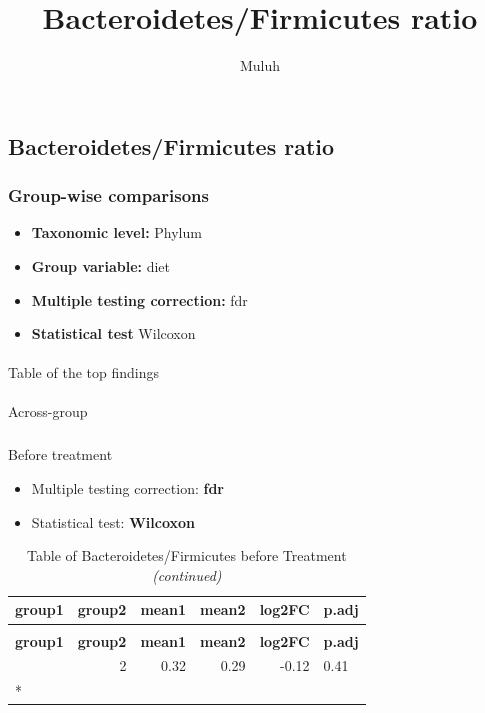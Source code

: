 \documentclass[
  letterpaper,
  DIV=11,
  numbers=noendperiod]{scrartcl}
\title{Bacteroidetes/Firmicutes ratio}
\author{Muluh}
\date{}
\makeatletter
\let\oldparagraph\paragraph
\renewcommand{\paragraph}{
    \@ifstar
      \xxxParagraphStar
      \xxxParagraphNoStar
  }
\newcommand{\xxxParagraphStar}[1]{\oldparagraph*{#1}\mbox{}}
\newcommand{\xxxParagraphNoStar}[1]{\oldparagraph{#1}\mbox{}}
\let\oldsubparagraph\subparagraph
\renewcommand{\subparagraph}{
    \@ifstar
      \xxxSubParagraphStar
      \xxxSubParagraphNoStar
  }
\newcommand{\xxxSubParagraphStar}[1]{\oldsubparagraph*{#1}\mbox{}}
\newcommand{\xxxSubParagraphNoStar}[1]{\oldsubparagraph{#1}\mbox{}}
\providecommand{\tightlist}{%
  \setlength{\itemsep}{0pt}\setlength{\parskip}{0pt}}\usepackage{longtable,booktabs,array}
\makeatother
\begin{document}
\maketitle


\subsection{Bacteroidetes/Firmicutes
ratio}\label{bacteroidetesfirmicutes-ratio}

\subsubsection{Group-wise comparisons}\label{group-wise-comparisons}

\begin{itemize}
\tightlist
\item
  \textbf{Taxonomic level:} Phylum
\item
  \textbf{Group variable:} diet
\item
  \textbf{Multiple testing correction:} fdr
\item
  \textbf{Statistical test} Wilcoxon
\end{itemize}

\paragraph{Table of the top findings}\label{table-of-the-top-findings}

\paragraph{Across-group}\label{across-group}

\subparagraph{Before treatment}\label{before-treatment}

\begin{itemize}
\tightlist
\item
  Multiple testing correction: \textbf{fdr}
\item
  Statistical test: \textbf{Wilcoxon}
\end{itemize}

\begin{longtable}[t]{lrrrrl}
\caption{Table of Bacteroidetes/Firmicutes before Treatment}\\
\toprule
\textbf{group1} & \textbf{group2} & \textbf{mean1} & \textbf{mean2} & \textbf{log2FC} & \textbf{p.adj}\\
\midrule
\endfirsthead
\caption[]{Table of Bacteroidetes/Firmicutes before Treatment \textit{(continued)}}\\
\toprule
\textbf{group1} & \textbf{group2} & \textbf{mean1} & \textbf{mean2} & \textbf{log2FC} & \textbf{p.adj}\\
\midrule
\endhead

\endfoot
\bottomrule
\endlastfoot
1 & 2 & 0.32 & 0.29 & -0.12 & 0.41\\*
\end{longtable}
\end{document}
